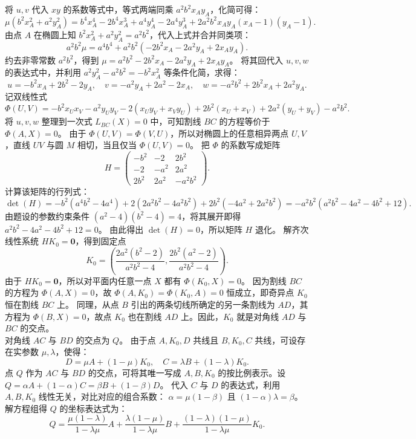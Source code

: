 \begin{solution}
将 $u, v$ 代入 $xy$ 的系数等式中，等式两端同乘 $a^2b^2 x_A y_A$，化简可得：
\[ \mu(b^2 x_A^2 + a^2 y_A^2) = b^4 x_A^4 - 2b^4 x_A^3 + a^4 y_A^4 - 2a^4 y_A^3 + 2a^2b^2 x_A y_A (x_A-1)(y_A-1). \]
由点 $A$ 在椭圆上知 $b^2 x_A^2 + a^2 y_A^2 = a^2b^2$，代入上式并合并同类项：
\[ a^2b^2 \mu = a^4b^4 + a^2b^2(-2b^2 x_A - 2a^2 y_A + 2x_A y_A). \]
约去非零常数 $a^2b^2$，得到 $\mu = a^2b^2 - 2b^2 x_A - 2a^2 y_A + 2x_A y_A$。
将其回代入 $u, v, w$ 的表达式中，并利用 $a^2 y_A^2 - a^2b^2 = -b^2 x_A^2$ 等条件化简，求得：
\[ u = -b^2 x_A + 2b^2 - 2y_A, \quad v = -a^2 y_A + 2a^2 - 2x_A, \quad w = -a^2b^2 + 2b^2 x_A + 2a^2 y_A. \]
记双线性式
\[ \Phi(U, V) = -b^2 x_U x_V - a^2 y_U y_V - 2(x_U y_V + x_V y_U) + 2b^2(x_U + x_V) + 2a^2(y_U + y_V) - a^2b^2. \]
将 $u, v, w$ 整理到一次式 $L_{BC}(X) = 0$ 中，可知割线 $BC$ 的方程等价于 $\Phi(A, X) = 0$。
由于 $\Phi(U, V) = \Phi(V, U)$，所以对椭圆上的任意相异两点 $U, V$，直线 $UV$ 与圆 $M$ 相切，当且仅当 $\Phi(U, V) = 0$。
把 $\Phi$ 的系数写成矩阵
\[ H = \begin{pmatrix} -b^2 & -2 & 2b^2 \\ -2 & -a^2 & 2a^2 \\ 2b^2 & 2a^2 & -a^2b^2 \end{pmatrix}. \]
计算该矩阵的行列式：
\[ \det(H) = -b^2(a^4b^2 - 4a^4) + 2(2a^2b^2 - 4a^2b^2) + 2b^2(-4a^2 + 2a^2b^2) = -a^2b^2(a^2b^2 - 4a^2 - 4b^2 + 12). \]
由题设的参数约束条件 $(a^2-4)(b^2-4) = 4$，将其展开即得 $a^2b^2 - 4a^2 - 4b^2 + 12 = 0$。
由此得出 $\det(H) = 0$，所以矩阵 $H$ 退化。
解齐次线性系统 $H K_0 = \mathbf{0}$，得到固定点
\[ K_0 = \left( \frac{2a^2(b^2-2)}{a^2b^2-4}, \frac{2b^2(a^2-2)}{a^2b^2-4} \right). \]
由于 $H K_0 = \mathbf{0}$，所以对平面内任意一点 $X$ 都有 $\Phi(K_0, X) = 0$。
因为割线 $BC$ 的方程为 $\Phi(A, X) = 0$，故 $\Phi(A, K_0) = \Phi(K_0, A) = 0$ 恒成立，即奇异点 $K_0$ 恒在割线 $BC$ 上。
同理，从点 $B$ 引出的两条切线所确定的另一条割线为 $AD$，其方程为 $\Phi(B, X) = 0$，故点 $K_0$ 也在割线 $AD$ 上。因此，$K_0$ 就是对角线 $AD$ 与 $BC$ 的交点。\\
对角线 $AC$ 与 $BD$ 的交点为 $Q$。
由于点 $A, K_0, D$ 共线且 $B, K_0, C$ 共线，可设存在实参数 $\mu, \lambda$，使得：
\[ D = \mu A + (1-\mu) K_0, \quad C = \lambda B + (1-\lambda) K_0. \]
点 $Q$ 作为 $AC$ 与 $BD$ 的交点，可将其唯一写成 $A, B, K_0$ 的按比例表示。设 $Q = \alpha A + (1-\alpha) C = \beta B + (1-\beta) D$。
代入 $C$ 与 $D$ 的表达式，利用 $A, B, K_0$ 线性无关，对比对应的组合系数：
$\alpha = \mu(1-\beta)$ 且 $(1-\alpha)\lambda = \beta$。解方程组得 $Q$ 的坐标表达式为：
\[ Q = \frac{\mu(1-\lambda)}{1-\lambda\mu} A + \frac{\lambda(1-\mu)}{1-\lambda\mu} B + \frac{(1-\lambda)(1-\mu)}{1-\lambda\mu} K_0. \]

\end{solution}
